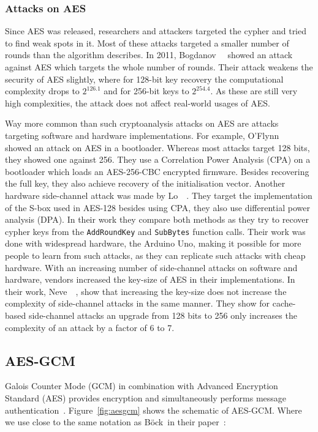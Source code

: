 \subsubsection{Attacks on AES}

Since AES was released, researchers and attackers targeted the cypher and tried
to find weak spots in it. Most of these attacks targeted a smaller number of
rounds than the algorithm describes. In 2011, Bogdanov~\etal~\cite{bicliqueaes}
showed an attack against AES which targets the whole number of rounds. Their
attack weakens the security of AES slightly, where for 128-bit key recovery the
computational complexity drops to $2^{126.1}$ and for 256-bit keys to
$2^{254.4}$. As these are still very high complexities, the attack does not
affect real-world usages of AES.

Way more common than such cryptoanalysis attacks on AES are attacks targeting
software and hardware implementations. For example,
O'Flynn~\etal~\cite{aespowerboot} showed an attack on AES in a bootloader.
Whereas most attacks target 128 bits, they showed one against 256. They use a
Correlation Power Analysis (CPA) on a bootloader which loads an AES-256-CBC
encrypted firmware. Besides recovering the full key, they also achieve recovery
of the initialisation vector. Another hardware side-channel attack was made by
Lo~\etal~\cite{sboxpoweranal}. They target the implementation of the S-box used
in AES-128 besides using CPA, they also use differential power analysis (DPA).
In their work they compare both methods as they try to recover cypher keys from
the \texttt{AddRoundKey} and \texttt{SubBytes} function calls. Their work was
done with widespread hardware, the Arduino Uno, making it possible for more
people to learn from such attacks, as they can replicate such attacks with cheap
hardware. With an increasing number of side-channel attacks on software and
hardware, vendors increased the key-size of AES in their implementations. In
their work, Neve~\etal~\cite{sidecomplex}, show that increasing the key-size
does not increase the complexity of side-channel attacks in the same manner.
They show for cache-based side-channel attacks an upgrade from 128 bits to 256
only increases the complexity of an attack by a factor of 6 to 7.

\subsection{AES-GCM}

Galois Counter Mode (GCM) in combination with Advanced Encryption Standard (AES)
provides encryption and simultaneously performs message
authentication~\cite{gcm, gcmnist}. Figure~\ref{fig:aesgcm} shows the schematic
of AES-GCM. Where we use close to the same notation as Böck~\etal in their
paper~\cite{gcmnonceattack}:

